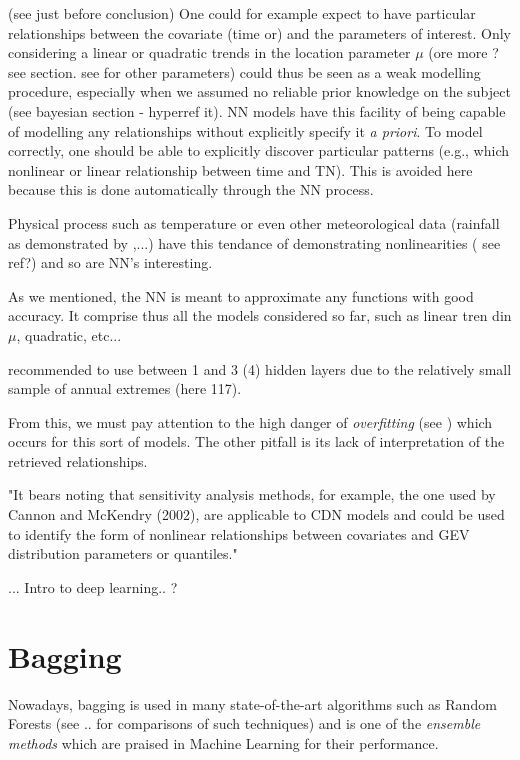 (see \citet{cannon_flexible_2010} just before conclusion) 
One could for example expect to have particular relationships between the covariate (time or) and the parameters of interest. Only considering a linear or quadratic trends in the location parameter $\mu$ (ore more ? see section. see for other parameters) could thus be seen as a weak modelling procedure, especially when we assumed no reliable prior knowledge on the subject (see bayesian section - hyperref it).
NN models have this facility of being capable of modelling any relationships without explicitly specify it \emph{a priori}. To model correctly, one should be able to explicitly discover particular patterns (e.g., which nonlinear or linear relationship between time and TN). This is avoided here because this is done automatically through the NN process.

Physical process such as temperature or even other meteorological data (rainfall as demonstrated by \citet{cannon_flexible_2010},...) have this tendance of demonstrating nonlinearities ( see ref?) and so are NN's interesting.

As we mentioned, the NN is meant to approximate any functions with good accuracy. It comprise thus all the models considered so far, such as linear tren din $\mu$, quadratic, etc...

\citet{cannon_flexible_2010} recommended to use between 1 and 3 (4) hidden layers due to the relatively small sample of annual extremes (here 117).


 From this, we must pay attention to the high danger of \emph{overfitting} (see ) which occurs for this sort of models. The other pitfall is its lack of interpretation of the retrieved relationships.
 
 "It bears noting that sensitivity analysis methods,
 for example, the one used by Cannon and McKendry
 (2002), are applicable to CDN models and could be used
 to identify the form of nonlinear relationships between
 covariates and GEV distribution parameters or quantiles."
 
 ... Intro to deep learning.. ?
 
\section{Bagging} 

Nowadays, bagging is used in 
many state-of-the-art algorithms such as Random Forests (see .. for comparisons of such techniques) and is one of the \emph{ensemble methods} which are praised in Machine Learning for their performance.  


